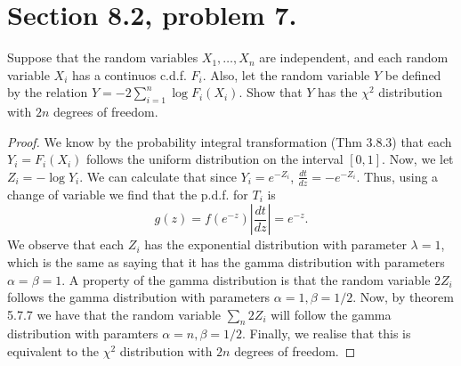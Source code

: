 \documentclass{article}
\newcommand{\randsamp}{X_1,\dots,X_n}
\newcommand{\pdf}{p.d.f. }
\newcommand{\cdf}{c.d.f. }
\newenvironment{hwproof}[1]
{
    #1
    \begin{proof}
}{
    \end{proof}
}
\begin{document}
\section{Section 8.2, problem 7.}
\begin{hwproof}
    {
        Suppose that the random variables $\randsamp$ are independent,
        and each random variable $X_i$ has a continuos \cdf $F_i$. Also, let the
        random variable $Y$ be defined by the relation
        $Y = -2\sum_{i=1}^n \log F_i(X_i)$. Show that $Y$ has the $\chi^2$
        distribution with $2n$ degrees of freedom.
    }

    We know by the probability integral transformation (Thm 3.8.3) that each
    $Y_i = F_i(X_i)$ follows the uniform distribution on the interval $[0,1]$.
    Now, we let $Z_i = -\log{Y_i}$. We can calculate that since
    $Y_i = e^{-Z_i}$, $\frac{dt}{dz} = - e^{-Z_i}$. Thus, using a change of
    variable we find that the \pdf for $T_i$ is
    \begin{equation*}
        g(z) = f(e^{-z}) |\frac{dt}{dz}| = e^{-z}.
    \end{equation*}
    We observe that each $Z_i$ has the exponential distribution with parameter
    $\lambda = 1$, which is the same as saying that it has the gamma distribution
    with parameters $\alpha = \beta = 1$. A property of the gamma distribution is
    that the random variable $2Z_i$ follows the gamma distribution with
    parameters $\alpha = 1, \beta = 1/2$. Now, by theorem 5.7.7 we have that
    the random variable $\sum_n 2Z_i$ will follow the gamma distribution with
    paramters $\alpha = n, \beta = 1/2$. Finally, we realise that this is
    equivalent to the $\chi^2$ distribution with $2n$ degrees of freedom.
\end{hwproof}
\end{document}
